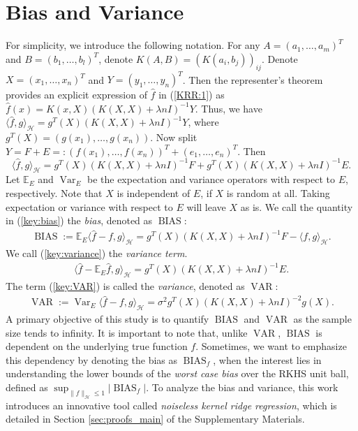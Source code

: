 \documentclass[12pt]{article}
\theoremstyle{plain}
\theoremstyle{remark}
\begin{document}
 
 







\section{Bias and Variance}\label{sec:BnV}

For simplicity, we introduce the following notation. For any $A=(a_1,\ldots,a_m)^T$ and $B=(b_1,\ldots,b_l)^T$, denote $K(A,B)=(K(a_i,b_j))_{i j}$. Denote $X=(x_1,\ldots,x_n)^T$ and $Y=(y_1,\ldots,y_n)^T$.
Then the representer's theorem \citep{scholkopf2001generalized,wahba1990spline} provides an explicit expression of $\hat{f}$ in (\ref{KRR:1}) as 
$\hat{f}(x)=K(x,X)(K(X,X)+\lambda n I)^{-1}Y$.
Thus, we have
$\langle \hat{f},g\rangle_\mathcal{H}=g^T(X)(K(X,X)+\lambda n I)^{-1}Y$,
where $g^T(X)=(g(x_1),\ldots,g(x_n))$. Now split $Y=F+E=:(f(x_1),\ldots,f(x_n))^T+(e_1,\ldots,e_n)^T$. Then
\[\langle \hat{f},g\rangle_\mathcal{H}=g^T(X)(K(X,X)+\lambda n I)^{-1}F+g^T(X)(K(X,X)+\lambda n I)^{-1}E.\]
Let $\mathbb{E}_E$ and $\operatorname{Var}_E$ be the expectation and variance operators with respect to $E$, respectively. Note that $X$ is independent of $E$, if $X$ is random at all. Taking expectation or variance with respect to $E$ will leave $X$ as is. 
We call the quantity in (\ref{key:bias}) the \textit{bias}, denoted as $\operatorname{BIAS}$:
\begin{eqnarray}\label{key:bias}
 \operatorname{BIAS}:=\mathbb{E}_E\langle \hat{f}-f,g\rangle_\mathcal{H}=g^T(X)(K(X,X)+\lambda n I)^{-1}F-\langle f,g\rangle_\mathcal{H}. 
\end{eqnarray}
We call (\ref{key:variance}) the \textit{variance term}.
\begin{eqnarray}\label{key:variance}
    \langle \hat{f}-\mathbb{E}_E\hat{f},g\rangle_\mathcal{H}=g^T(X)(K(X,X)+\lambda n I)^{-1}E.
\end{eqnarray}
The term (\ref{key:VAR}) is called the \textit{variance}, denoted as $\operatorname{VAR}$:
\begin{eqnarray}\label{key:VAR}
   \operatorname{VAR}:=\operatorname{Var}_E \langle \hat{f}-f,g\rangle_\mathcal{H}=\sigma^2g^T(X)(K(X,X)+\lambda n I)^{-2}g(X).
\end{eqnarray}
A primary objective of this study is to quantify  $\operatorname{BIAS}$ and $\operatorname{VAR}$ as the sample size tends to infinity. It is important to note that, unlike $\operatorname{VAR}$, $\operatorname{BIAS}$ is dependent on the underlying true function $f$. Sometimes, we want to emphasize this dependency by denoting the bias as $\operatorname{BIAS}_f$, when the interest lies in understanding the lower bounds of the \textit{worst case bias} over the RKHS unit ball, defined as $\sup_{\|f\|_\mathcal{H}\leq 1}|\operatorname{BIAS}_f|$.
To analyze the bias and variance, this work introduces an innovative tool called \textit{noiseless kernel ridge regression}, which is detailed in Section \ref{sec:proofs_main} of the Supplementary Materials.
\end{document}
